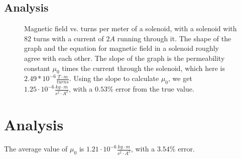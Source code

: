 \documentclass{article}
\begin{document}
\subsection{Analysis}
\begin{figure}[H]
    \centering
    \caption{Magnetic field vs. turns per meter of a solenoid, with a solenoid with 82 turns with a current of $2 A$ running through it. The shape of the graph and the equation for magnetic field in a solenoid roughly agree with each other. The slope of the graph is the permeability constant $\mu_0$ times the current through the solenoid, which here is $2.49 * 10^{-6} \frac{T \cdot m}{turns}$. Using the slope to calculate $\mu_0$, we get $1.25 \cdot 10^{-6} \frac{kg \cdot m}{s^2 \cdot A^2}$, with a $0.53\%$ error from the true value.}
\end{figure}
\section{Analysis}
The average value of $\mu_0$ is $1.21 \cdot 10^{-6} \frac{kg \cdot m}{s^2 \cdot A^2}$, with a $3.54\%$ error.
\end{document}
